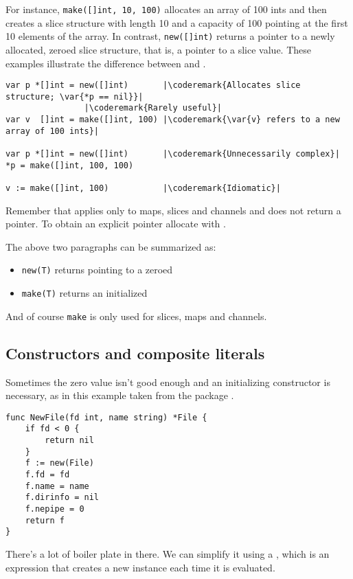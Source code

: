 For instance,
\lstinline{make([]int, 10, 100)}
allocates an array of 100 ints and then creates a slice structure with
length 10 and a capacity of 100 pointing at the first 10 elements of the
array. In contrast,
\lstinline{new([]int)} returns
a pointer to a newly allocated, zeroed slice structure, that is, a
pointer to a  slice value.
These examples illustrate the difference between  and
.
\begin{lstlisting}
var p *[]int = new([]int)       |\coderemark{Allocates slice structure; \var{*p == nil}}|
				|\coderemark{Rarely useful}|
var v  []int = make([]int, 100) |\coderemark{\var{v} refers to a new array of 100 ints}|

var p *[]int = new([]int)       |\coderemark{Unnecessarily complex}|
*p = make([]int, 100, 100)

v := make([]int, 100)           |\coderemark{Idiomatic}|
\end{lstlisting}
Remember that  applies only to maps, slices and channels and does
not return a pointer. To obtain an explicit pointer allocate with
.

\begin{lbar}
The above two paragraphs can be summarized as:
\begin{itemize}
\item \lstinline{new(T)} returns  pointing to a zeroed 
\item \lstinline{make(T)} returns an initialized 
\end{itemize}
And of course \lstinline{make} is only used for slices, maps and channels.
\end{lbar}

\subsection{Constructors and composite literals}
\label{sec:constructors and composite literals}
Sometimes the zero value isn't good enough and an initializing
constructor is necessary, as in this example taken from the package
.
\begin{lstlisting}
func NewFile(fd int, name string) *File {
    if fd < 0 {
        return nil
    }
    f := new(File)
    f.fd = fd
    f.name = name
    f.dirinfo = nil
    f.nepipe = 0
    return f
}
\end{lstlisting}
There's a lot of boiler plate in there. We can simplify it using a
, which is an expression that 
creates a new instance each time it is evaluated.


